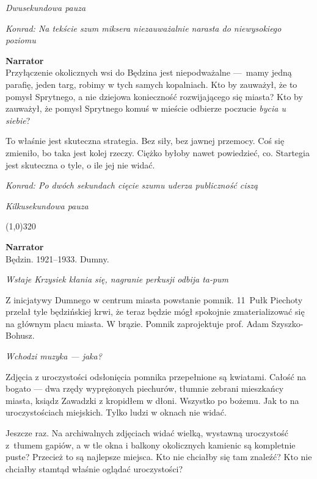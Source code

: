 \documentclass[11pt,a4paper,oneside]{article}
\begin{document}
{\color{light-gray} \emph{Dwusekundowa pauza}}

{\color{konrad} \emph{Konrad: Na tekście szum miksera niezauważalnie narasta do niewysokiego poziomu}}

\textbf{Narrator}\\
Przyłączenie okolicznych wsi do Będzina jest niepodważalne \mbox{---}~mamy
jedną parafię, jeden targ, robimy w  tych samych kopalniach. Kto by
zauważył, że to pomysł Sprytnego, a nie dziejowa konieczność
rozwijającego się miasta?  Kto by zauważył, że pomysł Sprytnego komuś
w mieście odbierze poczucie \emph{bycia u siebie}?

To właśnie jest skuteczna strategia. Bez siły, bez jawnej przemocy.
Coś się zmieniło, bo taka jest kolej rzeczy.  Ciężko byłoby nawet
powiedzieć, co. Startegia jest skuteczna o tyle, o ile jej nie widać. 

{\color{konrad} \emph{Konrad: Po dwóch sekundach cięcie szumu uderza publiczność ciszą}}

{\color{light-gray} \emph{Kilkusekundowa pauza}}


\line(1,0){320}

\textbf{Narrator}\\
Będzin. 1921--1933. Dumny. 

{\color{light-gray} \emph{Wstaje Krzysiek kłania się, nagranie
perkusji odbija ta-pum}}

Z inicjatywy Dumnego w centrum miasta powstanie pomnik. 11~Pułk
Piechoty przelał tyle będzińskiej krwi, że teraz będzie mógł spokojnie
zmaterializować się na głównym placu miasta. W brązie. Pomnik
zaprojektuje prof. Adam Szyszko-Bohusz.

{\color{light-gray} \emph{Wchodzi muzyka --- jaka?}}

Zdjęcia z uroczystości odsłonięcia pomnika przepełnione są kwiatami.
Całość na bogato --- dwa rzędy wyprężonych piechurów, tłumnie zebrani
mieszkańcy miasta, ksiądz Zawadzki z kropidłem w dłoni.  Wszystko po
bożemu.  Jak to na uroczystościach miejskich.  Tylko ludzi w oknach
nie widać.

Jeszcze raz. Na archiwalnych zdjęciach widać wielką, wystawną
uroczystość z~tłumem gapiów, a w tle okna i balkony okolicznych
kamienic są kompletnie puste?  Przecież to są najlepsze miejsca. Kto
nie chciałby się tam znaleźć?  Kto nie chciałby stamtąd właśnie
oglądać uroczystości?
\end{document}
